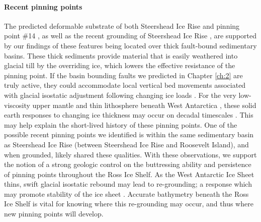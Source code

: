 \paragraph*{Recent pinning points}
The predicted deformable substrate of both Steershead Ice Rise and pinning point \#14 \citep{stillmechanical2019}, as well as the recent grounding of Steershead Ice Rise \citep{fahnestockmillennium2000}, are supported by our findings of these features being located over thick fault-bound sedimentary basins. These thick sediments provide material that is easily weathered into glacial till by the overriding ice, which lowers the effective resistance of the pinning point. If the basin bounding faults we predicted in Chapter \ref{ch:2} are truly active, they could accommodate local vertical bed movements associated with glacial isostatic adjustment following changing ice loads \citep{peltierglacial2022, steffenglacially2021}. For the very low-viscosity upper mantle and thin lithosphere beneath West Antarctica \citep{pappamoho2019, chenvariations2018}, these solid earth responses to changing ice thickness may occur on decadal timescales \citep{barlettaobserved2018}. This may help explain the short-lived history of these pinning points. One of the possible recent pinning points we identified is within the same sedimentary basin as Steershead Ice Rise (between Steershead Ice Rise and Roosevelt Island), and when grounded, likely shared these qualities. With these observations, we support the notion of a strong geologic control on the buttressing ability and persistence of pinning points throughout the Ross Ice Shelf. As the West Antarctic Ice Sheet thins, swift glacial isostatic rebound may lead to re-grounding; a response which may promote stability of the ice sheet \citep{couloncontrasting2021, barlettaobserved2018, kachuckrapid2020}. Accurate bathymetry beneath the Ross Ice Shelf is vital for knowing where this re-grounding may occur, and thus where new pinning points will develop. 


